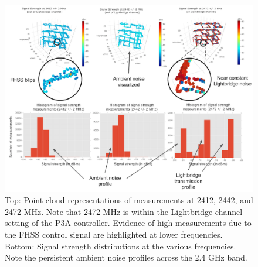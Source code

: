 \documentclass[pageno]{jpaper}
\begin{document}
\begin{figure}
	\caption{Top: Point cloud representations of measurements at 2412, 2442, and 2472 MHz. Note that 2472 MHz is within the Lightbridge channel setting of the P3A controller. Evidence of high measurements due to the FHSS control signal are highlighted at lower frequencies. Bottom: Signal strength distributions at the various frequencies. Note the persistent ambient noise profiles across the 2.4 GHz band. }
	\centerline{\includegraphics{PoC_2}}
\end{figure}
\end{document}
